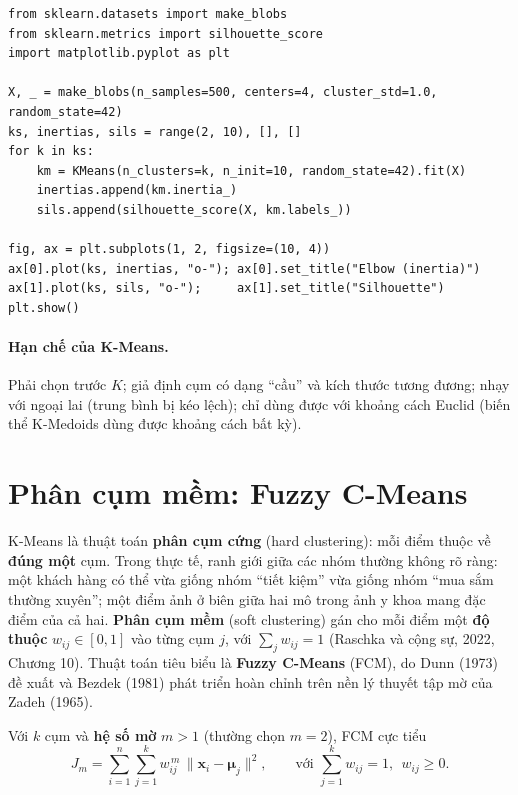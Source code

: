 \begin{lstlisting}[caption={Chọn K bằng elbow và silhouette}]
from sklearn.datasets import make_blobs
from sklearn.metrics import silhouette_score
import matplotlib.pyplot as plt

X, _ = make_blobs(n_samples=500, centers=4, cluster_std=1.0, random_state=42)
ks, inertias, sils = range(2, 10), [], []
for k in ks:
    km = KMeans(n_clusters=k, n_init=10, random_state=42).fit(X)
    inertias.append(km.inertia_)
    sils.append(silhouette_score(X, km.labels_))

fig, ax = plt.subplots(1, 2, figsize=(10, 4))
ax[0].plot(ks, inertias, "o-"); ax[0].set_title("Elbow (inertia)")
ax[1].plot(ks, sils, "o-");     ax[1].set_title("Silhouette")
plt.show()
\end{lstlisting}


\paragraph{Hạn chế của K-Means.} Phải chọn trước $K$; giả định cụm có dạng ``cầu'' và kích thước tương đương; nhạy với ngoại lai (trung bình bị kéo lệch); chỉ dùng được với khoảng cách Euclid (biến thể K-Medoids dùng được khoảng cách bất kỳ).

\section{Phân cụm mềm: Fuzzy C-Means}
\label{sec:fcm}

K-Means là thuật toán \textbf{phân cụm cứng} (hard clustering): mỗi điểm thuộc về \textbf{đúng một} cụm. Trong thực tế, ranh giới giữa các nhóm thường không rõ ràng: một khách hàng có thể vừa giống nhóm ``tiết kiệm'' vừa giống nhóm ``mua sắm thường xuyên''; một điểm ảnh ở biên giữa hai mô trong ảnh y khoa mang đặc điểm của cả hai. \textbf{Phân cụm mềm} (soft clustering) gán cho mỗi điểm một \textbf{độ thuộc} $w_{ij} \in [0, 1]$ vào từng cụm $j$, với $\sum_{j} w_{ij} = 1$ (Raschka và cộng sự, 2022, Chương 10). Thuật toán tiêu biểu là \textbf{Fuzzy C-Means} (FCM), do Dunn (1973) đề xuất và Bezdek (1981) phát triển hoàn chỉnh trên nền lý thuyết tập mờ của Zadeh (1965).

\begin{definition}
Với $k$ cụm và \textbf{hệ số mờ} $m > 1$ (thường chọn $m = 2$), FCM cực tiểu
\begin{equation}
    J_m = \sum_{i=1}^{n}\sum_{j=1}^{k} w_{ij}^{\,m}\,\big\|\mathbf{x}_i - \boldsymbol{\mu}_j\big\|^2,
    \qquad \text{với } \sum_{j=1}^{k} w_{ij} = 1,\ \ w_{ij} \geq 0 .
\end{equation}
\end{definition}

